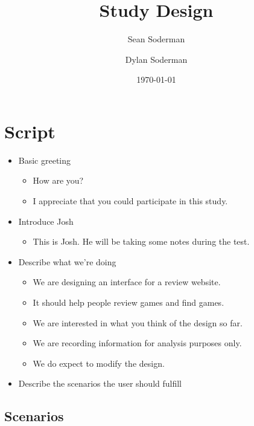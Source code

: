 \documentclass[11pt]{extarticle}
\begin{document}
\title{Study Design}
\author{Sean Soderman\\ 
        \and
        Dylan Soderman
}
\date{\today}
\maketitle

\section*{Script}
\begin{itemize}
   \item Basic greeting
      \begin{itemize}
      \item How are you?
      \item I appreciate that you could participate in this study.
      \end{itemize}
\end{itemize}
\begin{itemize}
   \item Introduce Josh
      \begin{itemize}
      \item This is Josh. He will be taking some notes during the test.
      \end{itemize}
\end{itemize}
\begin{itemize}
   \item Describe what we're doing
      \begin{itemize}
      \item We are designing an interface for a review website.
      \item It should help people review games and find games.
      \item We are interested in what you think of the design so far.
      \item We are recording information for analysis purposes only.
      \item We do expect to modify the design.
      \end{itemize}
\end{itemize}
\begin{itemize}
   \item Describe the scenarios the user should fulfill
\end{itemize}
\subsection*{Scenarios}
\end{document}
